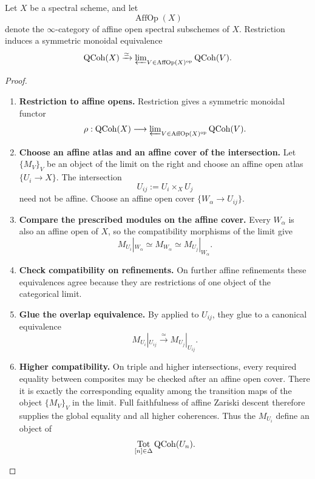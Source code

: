 \begin{lemma}
\label{lem:qcoh-affine-open-basis}
Let $X$ be a spectral scheme, and let
\[
    \operatorname{AffOp}(X)
\]
denote the $\infty$-category of affine open spectral subschemes of $X$.
Restriction induces a symmetric monoidal equivalence
\[
    \operatorname{QCoh}(X)
    \xrightarrow{\simeq}
    \varprojlim\nolimits_
    {V\in\operatorname{AffOp}(X)^{\mathrm{op}}}
    \operatorname{QCoh}(V).
\]
\end{lemma}

\begin{proof}
\leavevmode
\begin{enumerate}[label=\textup{(\arabic*)}]
    \item \textbf{Restriction to affine opens.}
    Restriction gives a symmetric monoidal functor
    \[
        \rho:\operatorname{QCoh}(X)
        \longrightarrow
        \varprojlim\nolimits_{V\in\operatorname{AffOp}(X)^{\mathrm{op}}}\operatorname{QCoh}(V).
    \]

    \item \textbf{Choose an affine atlas and an affine cover of the intersection.}
    Let \(\{M_V\}_V\) be an object of the limit on the right and choose an
    affine open atlas \(\{U_i\to X\}\). The intersection
    \[
        U_{ij}:=U_i\times_XU_j
    \]
    need not be affine. Choose an affine open cover
    \(\{W_\alpha\to U_{ij}\}\).

    \item \textbf{Compare the prescribed modules on the affine cover.}
    Every \(W_\alpha\) is also an affine open
    of \(X\), so the compatibility morphisms of the limit give
    \[
        M_{U_i}|_{W_\alpha}
        \simeq
        M_{W_\alpha}
        \simeq
        M_{U_j}|_{W_\alpha}.
    \]

    \item \textbf{Check compatibility on refinements.}
    On further affine refinements these equivalences agree because they are
    restrictions of one object of the categorical limit.

    \item \textbf{Glue the overlap equivalence.}
    By
     applied to \(U_{ij}\), they glue to a
    canonical equivalence
    \[
        M_{U_i}|_{U_{ij}}
        \xrightarrow{\simeq}
        M_{U_j}|_{U_{ij}}.
    \]

    \item \textbf{Higher compatibility.}
    On triple and higher intersections, every required equality between
    composites may be checked after an affine open cover. There it is exactly
    the corresponding equality among the transition maps of the object
    \(\{M_V\}_V\) in the limit. Full faithfulness of affine Zariski descent
    therefore supplies the global equality and all higher coherences. Thus
    the \(M_{U_i}\) define an object of
    \[
        \operatorname*{Tot}_{[n]\in\Delta}\operatorname{QCoh}(U_n).
    \]


\end{enumerate}
\end{proof}
